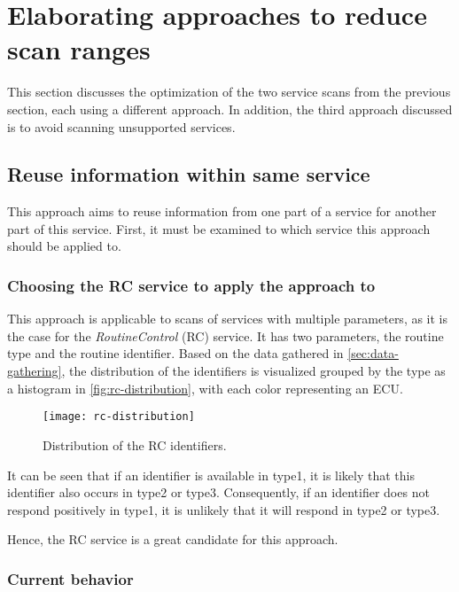 \chapter{Elaborating approaches to reduce scan ranges}

This section discusses the optimization of the two service scans from the previous section, each using a different approach. In addition, the third approach discussed is to avoid scanning unsupported services.

\section{Reuse information within same service}

This approach aims to reuse information from one part of a service for another part of this service. First, it must be examined to which service this approach should be applied to.

\subsection{Choosing the RC service to apply the approach to}

This approach is applicable to scans of services with multiple parameters, as it is the case for the \emph{RoutineControl} (RC) service. It has two parameters, the routine type and the routine identifier. Based on the data gathered in \autoref{sec:data-gathering}, the distribution of the identifiers is visualized grouped by the type as a histogram in \autoref{fig:rc-distribution}, with each color representing an ECU.

\begin{figure}[htb]
    \centering
    \texttt{[image: rc-distribution]}
    \caption{Distribution of the RC identifiers.}
    \label{fig:rc-distribution}
\end{figure}

It can be seen that if an identifier is available in type1, it is likely that this identifier also occurs in type2 or type3. Consequently, if an identifier does not respond positively in type1, it is unlikely that it will respond in type2 or type3.

Hence, the RC service is a great candidate for this approach.

\subsection{Current behavior}

